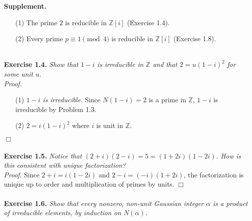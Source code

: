 \documentclass{article}
\begin{document}
\textbf{Supplement.}
\begin{enumerate}
\item[(1)]
The prime $2$ is reducible in $\mathbb{Z}[i]$ (Exercise 1.4).
\item[(2)]
Every prime $p \equiv 1 \pmod{4}$ is reducible in $\mathbb{Z}[i]$ (Exercise 1.8). \\\\
\end{enumerate}






\textbf{Exercise 1.4.}
\emph{Show that $1-i$ is irreducible in $\mathbb{Z}$
and that $2 = u(1-i)^2$ for some unit $u$.} \\

\emph{Proof.}
\begin{enumerate}
\item[(1)]
\emph{$1-i$ is irreducible.}
Since $N(1-i) = 2$ is a prime in $\mathbb{Z}$,
$1-i$ is irreducible by Problem 1.3.
\item[(2)]
$2 = i(1-i)^2$ where $i$ is unit in $\mathbb{Z}$.
\end{enumerate}
$\Box$ \\\\






\textbf{Exercise 1.5.}
\emph{Notice that
$(2+i)(2-i) = 5 = (1+2i)(1-2i)$.
How is this consistent with unique factorization?} \\

\emph{Proof.}
Since $2+i = i(1-2i)$ and $2-i = (-i)(1+2i)$,
the factorization is unique up to order and multiplication of primes by units.
$\Box$ \\\\






\textbf{Exercise 1.6.}
\emph{Show that every nonzero, non-unit Gaussian integer $\alpha$
is a product of irreducible elements, by induction on $N(\alpha)$.} \\
\end{document}
